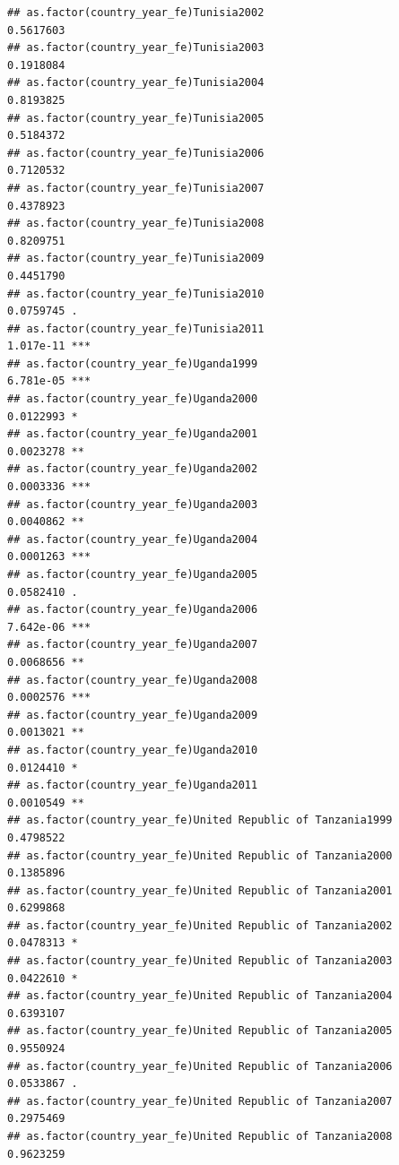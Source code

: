 \documentclass[
  a4paper,
]{article}
\begin{document}
\begin{verbatim}
## as.factor(country_year_fe)Tunisia2002                          0.5617603    
## as.factor(country_year_fe)Tunisia2003                          0.1918084    
## as.factor(country_year_fe)Tunisia2004                          0.8193825    
## as.factor(country_year_fe)Tunisia2005                          0.5184372    
## as.factor(country_year_fe)Tunisia2006                          0.7120532    
## as.factor(country_year_fe)Tunisia2007                          0.4378923    
## as.factor(country_year_fe)Tunisia2008                          0.8209751    
## as.factor(country_year_fe)Tunisia2009                          0.4451790    
## as.factor(country_year_fe)Tunisia2010                          0.0759745 .  
## as.factor(country_year_fe)Tunisia2011                          1.017e-11 ***
## as.factor(country_year_fe)Uganda1999                           6.781e-05 ***
## as.factor(country_year_fe)Uganda2000                           0.0122993 *  
## as.factor(country_year_fe)Uganda2001                           0.0023278 ** 
## as.factor(country_year_fe)Uganda2002                           0.0003336 ***
## as.factor(country_year_fe)Uganda2003                           0.0040862 ** 
## as.factor(country_year_fe)Uganda2004                           0.0001263 ***
## as.factor(country_year_fe)Uganda2005                           0.0582410 .  
## as.factor(country_year_fe)Uganda2006                           7.642e-06 ***
## as.factor(country_year_fe)Uganda2007                           0.0068656 ** 
## as.factor(country_year_fe)Uganda2008                           0.0002576 ***
## as.factor(country_year_fe)Uganda2009                           0.0013021 ** 
## as.factor(country_year_fe)Uganda2010                           0.0124410 *  
## as.factor(country_year_fe)Uganda2011                           0.0010549 ** 
## as.factor(country_year_fe)United Republic of Tanzania1999      0.4798522    
## as.factor(country_year_fe)United Republic of Tanzania2000      0.1385896    
## as.factor(country_year_fe)United Republic of Tanzania2001      0.6299868    
## as.factor(country_year_fe)United Republic of Tanzania2002      0.0478313 *  
## as.factor(country_year_fe)United Republic of Tanzania2003      0.0422610 *  
## as.factor(country_year_fe)United Republic of Tanzania2004      0.6393107    
## as.factor(country_year_fe)United Republic of Tanzania2005      0.9550924    
## as.factor(country_year_fe)United Republic of Tanzania2006      0.0533867 .  
## as.factor(country_year_fe)United Republic of Tanzania2007      0.2975469    
## as.factor(country_year_fe)United Republic of Tanzania2008      0.9623259    

\end{verbatim}
\end{document}
